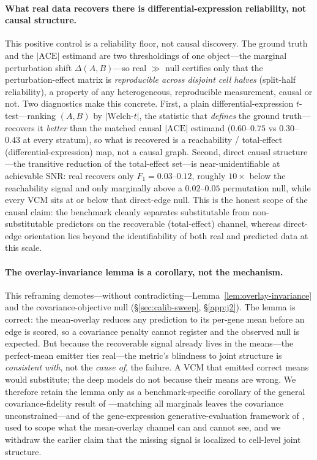 \documentclass{article}
\theoremstyle{plain}
\theoremstyle{definition}
\theoremstyle{remark}
\begin{document}
\paragraph{What real data recovers there is differential-expression reliability, not causal structure.}
This positive control is a reliability floor, not causal discovery. The ground truth and the $|\mathrm{ACE}|$ estimand are two thresholdings of one object---the marginal perturbation shift $\Delta(A,B)$---so real $\gg$ null certifies only that the perturbation-effect matrix is \emph{reproducible across disjoint cell halves} (split-half reliability), a property of any heterogeneous, reproducible measurement, causal or not. Two diagnostics make this concrete. First, a plain differential-expression $t$-test---ranking $(A,B)$ by $|\text{Welch-}t|$, the statistic that \emph{defines} the ground truth---recovers it \emph{better} than the matched causal $|\mathrm{ACE}|$ estimand ($0.60$--$0.75$ vs $0.30$--$0.43$ at every stratum), so what is recovered is a reachability / total-effect (differential-expression) map, not a causal graph. Second, direct causal structure---the transitive reduction of the total-effect set---is near-unidentifiable at achievable SNR: real recovers only $F_1 = 0.03$--$0.12$, roughly $10\times$ below the reachability signal and only marginally above a $0.02$--$0.05$ permutation null, while every VCM sits at or below that direct-edge null. This is the honest scope of the causal claim: the benchmark cleanly separates substitutable from non-substitutable predictors on the recoverable (total-effect) channel, whereas direct-edge orientation lies beyond the identifiability of both real and predicted data at this scale.

\paragraph{The overlay-invariance lemma is a corollary, not the mechanism.}
This reframing demotes---without contradicting---Lemma~\ref{lem:overlay-invariance} and the covariance-objective null (\S\ref{sec:calib-sweep}, \S\ref{app:j2}). The lemma is correct: the mean-overlay reduces any prediction to its per-gene mean before an edge is scored, so a covariance penalty cannot register and the observed null is expected. But because the recoverable signal already lives in the means---the perfect-mean emitter ties real---the metric's blindness to joint structure is \emph{consistent with}, not the \emph{cause of}, the failure. A VCM that emitted correct means would substitute; the deep models do not because their means are wrong. We therefore retain the lemma only as a benchmark-specific corollary of the general covariance-fidelity result of \citet{riasat2026marginals}---matching all marginals leaves the covariance unconstrained---and of the gene-expression generative-evaluation framework of \citet{rubbi2026ggeval}, used to scope what the mean-overlay channel can and cannot see, and we withdraw the earlier claim that the missing signal is localized to cell-level joint structure.
\end{document}
